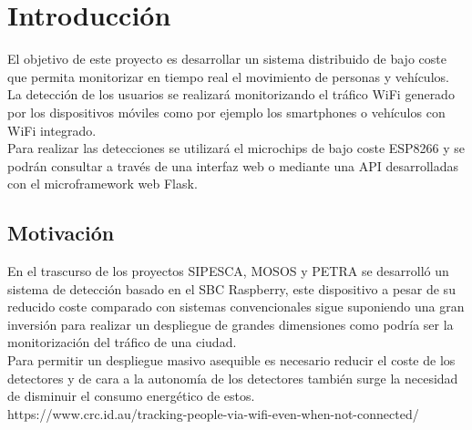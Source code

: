 \documentclass[../proyecto.tex]{subfiles}
\begin{document}
\chapter{Introducción}

El objetivo de este proyecto es desarrollar un sistema distribuido de bajo coste que permita monitorizar en tiempo real el movimiento de personas y vehículos. \\

La detección de los usuarios se realizará monitorizando el tráfico WiFi generado por los dispositivos móviles como por ejemplo los smartphones o vehículos con WiFi integrado.\\

Para realizar las detecciones se utilizará el microchips de bajo coste ESP8266 y se podrán consultar a través de una interfaz web o mediante una API desarrolladas con el microframework web Flask.\\

\section{Motivación}
En el trascurso de los proyectos SIPESCA, MOSOS y PETRA se desarrolló un sistema de detección basado en el SBC Raspberry, este dispositivo a pesar de su reducido coste comparado con sistemas convencionales sigue suponiendo una gran inversión para realizar un despliegue de grandes dimensiones como podría ser la monitorización del tráfico de una ciudad.\\

Para permitir un despliegue masivo asequible es necesario reducir el coste de los detectores y de cara a la autonomía de los detectores también surge la necesidad de disminuir el consumo energético de estos.\\









https://www.crc.id.au/tracking-people-via-wifi-even-when-not-connected/
\end{document}
